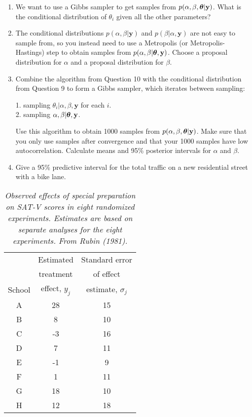 \documentclass[12pt]{article}
\def\y{\mathbf{y}}
\newcommand{\bth}{\mbox{\boldmath $\theta$}}
\begin{document}
\begin{enumerate}
	\item We want to use a Gibbs sampler to get samples from $p(\alpha,\beta,\bth|\y)$. What is the conditional distribution of $\theta_i$ given all the other parameters?
	
	\item The conditional distributions $p(\alpha,\beta|\y)$ and $p(\beta|\alpha,\y)$ are not easy to sample from, so you instead need to use a Metropolis (or Metropolis-Hastings) step to obtain samples from $p(\alpha,\beta|\bth,\y)$. Choose a proposal distribution for $\alpha$ and a proposal distribution for $\beta$.
	
	\item Combine the algorithm from Question 10 with the conditional distribution from Question 9 to form a Gibbs sampler, which iterates between sampling:
	
	1. sampling $\theta_i | \alpha,\beta,\y$ for each $i$.\\
	2. sampling $\alpha,\beta|\bth,\y$.
	
	Use this algorithm to obtain 1000 samples from $p(\alpha,\beta,\bth|\y)$. Make sure that you only use samples after convergence and that your 1000 samples have low autocorrelation. Calculate means and 95\% posterior intervals for $\alpha$ and $\beta$.
	
	\item Give a 95\% predictive interval for the total traffic on a new residential street with a bike lane. 
\end{enumerate}
\newpage
\begin{table}
	\centering 
	\begin{tabular}
		{ccc} & Estimated & Standard error \\
		& treatment & of effect \\
		School & effect, $y_j$ & estimate, $\sigma_j$ \\
		\hline A & 28 & 15 \\
		B & 8 & 10 \\
		C & -3 & 16 \\
		D & 7 & 11 \\
		E & -1 & 9 \\
		F & 1 & 11 \\
		G & 18 & 10 \\
		H & 12 & 18 
	\end{tabular}
	\caption{{\em Observed effects of special preparation on SAT-V scores in eight randomized experiments. Estimates are based on separate analyses for the eight experiments. From Rubin (1981).}} 
\end{table}
\end{document}
